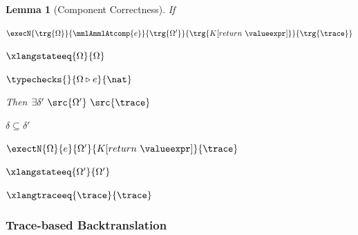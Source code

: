 \documentclass[a4paper,names,dvipsnames]{article}
\newtheorem{lemma}{Lemma}
\begin{document}
\begin{lemma}[Component Correctness]\label{lem:component:correctness}
  If
  \begin{assumptions}
    \item $\execN{\trg{\Omega}}{\mmlAmmlAtcomp{e}}{\trg{\Omega'}}{\trg{K[return\ \valueexpr]}}{\trg{\trace}}$
    \item $\xlangstateeq{\Omega}{\Omega}$
    \item $\typechecks{}{\Omega\triangleright e}{\nat}$
  \end{assumptions}
  Then $\exists \delta'\ \src{\Omega'}\ \src{\trace}$
  \begin{goals}
    \item $\delta\subseteq\delta'$
    \item $\exectN{\Omega}{e}{\Omega'}{K[return\ \valueexpr]}{\trace}$
    \item $\xlangstateeq{\Omega'}{\Omega'}$
    \item $\xlangtraceeq{\trace}{\trace}$
  \end{goals}
\end{lemma}
\begin{incompleteproof}
\end{incompleteproof}


\subsubsection{Trace-based Backtranslation}

\end{document}
